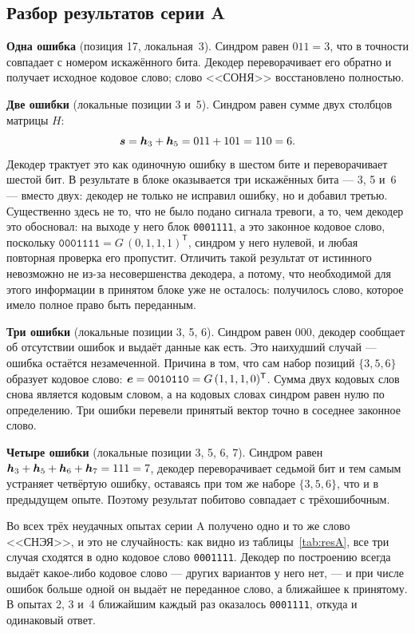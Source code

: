 \documentclass[a4paper,14pt]{extarticle}
\begin{document}
\subsection{Разбор результатов серии A}

\textbf{Одна ошибка} (позиция 17, локальная~3). Синдром равен $011 = 3$, что в точности
совпадает с номером искажённого бита. Декодер переворачивает его обратно и получает
исходное кодовое слово; слово <<СОНЯ>> восстановлено полностью.

\textbf{Две ошибки} (локальные позиции 3 и~5). Синдром равен сумме двух столбцов
матрицы $H$:
\begin{equation}
  \boldsymbol{s} = \boldsymbol{h}_3 + \boldsymbol{h}_5 = 011 + 101 = 110 = 6 .
\end{equation}
Декодер трактует это как одиночную ошибку в шестом бите и переворачивает шестой бит.
В результате в блоке оказывается три искажённых бита --- 3, 5 и~6 --- вместо двух:
декодер не только не исправил ошибку, но и добавил третью. Существенно здесь не то,
что не было подано сигнала тревоги, а то, чем декодер это обосновал: на выходе у него
блок \texttt{0001111}, а это законное кодовое слово, поскольку
$\texttt{0001111} = G\,(0,1,1,1)^{\mathsf{T}}$, синдром у него нулевой, и любая
повторная проверка его пропустит. Отличить такой результат от истинного невозможно не
из-за несовершенства декодера, а потому, что необходимой для этого информации в
принятом блоке уже не осталось: получилось слово, которое имело полное право быть
переданным.

\textbf{Три ошибки} (локальные позиции 3, 5, 6). Синдром равен $000$, декодер сообщает
об отсутствии ошибок и выдаёт данные как есть. Это наихудший случай --- ошибка остаётся
незамеченной. Причина в том, что сам набор позиций $\{3, 5, 6\}$ образует кодовое
слово: $\boldsymbol{e} = \texttt{0010110} = G\,(1,1,1,0)^{\mathsf{T}}$. Сумма двух кодовых
слов снова является кодовым словом, а на кодовых словах синдром равен нулю по
определению. Три ошибки перевели принятый вектор точно в соседнее законное слово.

\textbf{Четыре ошибки} (локальные позиции 3, 5, 6, 7). Синдром равен
$\boldsymbol{h}_3 + \boldsymbol{h}_5 + \boldsymbol{h}_6 + \boldsymbol{h}_7 = 111 = 7$, декодер переворачивает
седьмой бит и тем самым устраняет четвёртую ошибку, оставаясь при том же наборе
$\{3, 5, 6\}$, что и в предыдущем опыте. Поэтому результат побитово совпадает с
трёхошибочным.

Во всех трёх неудачных опытах серии A получено одно и то же слово <<СНЭЯ>>, и это не
случайность: как видно из таблицы~\ref{tab:resA}, все три случая сходятся в одно
кодовое слово \texttt{0001111}. Декодер по построению всегда выдаёт какое-либо кодовое
слово --- других вариантов у него нет, --- и при числе ошибок больше одной он выдаёт
не переданное слово, а ближайшее к принятому. В опытах 2, 3 и~4 ближайшим каждый раз
оказалось \texttt{0001111}, откуда и одинаковый ответ.
\end{document}
